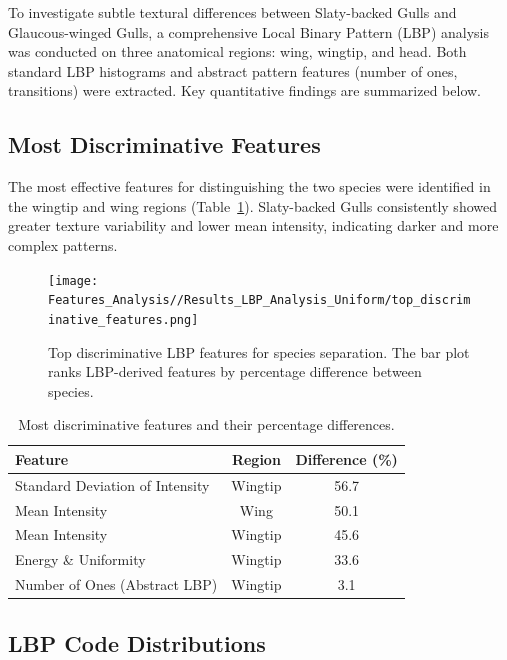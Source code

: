 \documentclass[a4paper,12pt]{report}
\begin{document}
To investigate subtle textural differences between Slaty-backed Gulls and Glaucous-winged Gulls, a comprehensive Local Binary Pattern (LBP) analysis was conducted on three anatomical regions: wing, wingtip, and head. Both standard LBP histograms and abstract pattern features (number of ones, transitions) were extracted. Key quantitative findings are summarized below.

\subsection{Most Discriminative Features}

The most effective features for distinguishing the two species were identified in the wingtip and wing regions (Table~\ref{tab:feature-diff}). Slaty-backed Gulls consistently showed greater texture variability and lower mean intensity, indicating darker and more complex patterns.

\begin{figure}[H]
    \centering
    \texttt{[image: Features\_Analysis//Results\_LBP\_Analysis\_Uniform/top\_discriminative\_features.png]}
    \caption{Top discriminative LBP features for species separation. The bar plot ranks LBP-derived features by percentage difference between species.}
    \label{fig:top-features}
\end{figure}

\begin{table}[H]
\centering
\caption{Most discriminative features and their percentage differences.}
\label{tab:feature-diff}
\begin{tabular}{lcc}
\hline
\textbf{Feature} & \textbf{Region} & \textbf{Difference (\%)} \\
\hline
Standard Deviation of Intensity & Wingtip & 56.7 \\
Mean Intensity & Wing & 50.1 \\
Mean Intensity & Wingtip & 45.6 \\
Energy \& Uniformity & Wingtip & 33.6 \\
Number of Ones (Abstract LBP) & Wingtip & 3.1 \\
\hline
\end{tabular}
\end{table}

\subsection{LBP Code Distributions}
\end{document}
